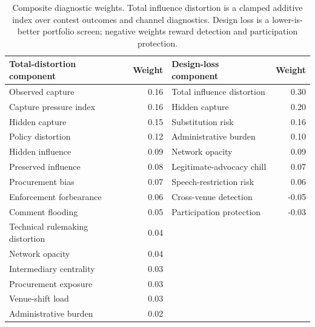 \begin{table}[tbp]
\centering
\scriptsize
\setlength{\tabcolsep}{3pt}
\begin{tabular*}{\textwidth}{@{\extracolsep{\fill}}lrlr@{}}
\toprule
Total-distortion component & Weight & Design-loss component & Weight \\
\midrule
Observed capture & 0.16 & Total influence distortion & 0.30 \\
Capture pressure index & 0.16 & Hidden capture & 0.20 \\
Hidden capture & 0.15 & Substitution risk & 0.16 \\
Policy distortion & 0.12 & Administrative burden & 0.10 \\
Hidden influence & 0.09 & Network opacity & 0.09 \\
Preserved influence & 0.08 & Legitimate-advocacy chill & 0.07 \\
Procurement bias & 0.07 & Speech-restriction risk & 0.06 \\
Enforcement forbearance & 0.06 & Cross-venue detection & -0.05 \\
Comment flooding & 0.05 & Participation protection & -0.03 \\
Technical rulemaking distortion & 0.04 & & \\
Network opacity & 0.04 & & \\
Intermediary centrality & 0.03 & & \\
Procurement exposure & 0.03 & & \\
Venue-shift load & 0.03 & & \\
Administrative burden & 0.02 & & \\
\bottomrule
\end{tabular*}
\caption{Composite diagnostic weights. Total influence distortion is a clamped additive index over contest outcomes and channel diagnostics. Design loss is a lower-is-better portfolio screen; negative weights reward detection and participation protection.}
\label{tab:composite-weights}
\end{table}
